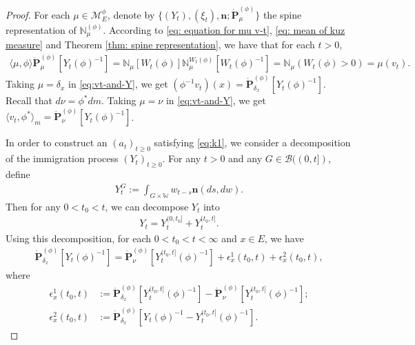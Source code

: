 \documentclass[12pt,a4paper]{amsart}
\theoremstyle{definition}
\numberwithin{equation}{section}
\begin{document}
\begin{proof}
  For each $\mu\in\mathcal M^\phi_E$, denote by $\{(Y_t), (\xi_t),\mathbf n; \dot {\mathbf P}^{(\phi)}_\mu\}$ the spine representation of $\mathbb N^{(\phi)}_\mu$.
	According to \eqref	{eq: equation for mu v-t}, \eqref{eq: mean of kuz measure} and Theorem \ref{thm: spine representation}, we have that for each $t>0$,
  \begin{align}
    \label{eq:vt-and-Y}
    \langle \mu,\phi \rangle \dot {\mathbf P}^{(\phi)}_\mu [Y_t(\phi)^{-1}]
    = \mathbb N_\mu[W_t(\phi)] \mathbb N^{W_t(\phi)}_\mu [W_t(\phi)^{-1}]
    = \mathbb N_\mu(W_t(\phi) > 0)
    = \mu(v_t).
  \end{align}
  Taking $\mu = \delta_x$ in \eqref{eq:vt-and-Y}, we get $(\phi^{-1}v_t)(x) =\dot{\mathbf P}_{\delta_x}^{(\phi)}[Y_t(\phi)^{-1}]$.
  Recall that $d\nu = \phi^* dm$.
  Taking $\mu = \nu$ in \eqref{eq:vt-and-Y}, we get $\langle v_t, \phi^*\rangle_m = \dot {\mathbf P}_{\nu}^{(\phi)} [Y_t(\phi)^{-1}]$.
  
  In order to construct an $(a_t)_{t\geq 0}$ satisfying \eqref{eq:k1}, we consider a decomposition of the immigration process $(Y_t)_{t\geq 0}$.
  For any $t>0$ and any $G\in \mathscr B((0,t])$, define
  \begin{align}
    Y^G_t
    := \int_{G\times \mathbb W} w_{t-s} \mathbf n(ds,dw).
  \end{align}
  Then for any $0 < t_0 < t$, we can decompose $Y_t$ into
  \begin{align}
    Y_t
    = Y^{(0,t_0]}_t + Y^{(t_0,t]}_t.
  \end{align}
  Using this decomposition, for each $0<t_0<t<\infty$ and $x\in E$, we have
  \begin{align}
    \label{eq: starting point of phi-1v_t(x)}
    \dot{\mathbf P}_{\delta_x}^{(\phi)}[Y_t(\phi)^{-1}]
    = \dot {\mathbf P}_\nu^{(\phi)} [Y^{(t_0,t]}_t(\phi)^{-1}] + \epsilon_x^1(t_0,t) +\epsilon_x^2(t_0,t),
  \end{align}
  where
  \begin{align}
    \epsilon_x^1(t_0,t)
    &:= \dot {\mathbf P}_{\delta_x}^{(\phi)} [Y^{(t_0,t]}_t(\phi)^{-1}] - \dot {\mathbf P}_\nu^{(\phi)} [Y^{(t_0,t]}_t(\phi)^{-1}];
    \\\epsilon_x^2(t_0,t)
    &:= \dot{\mathbf P}_{\delta_x}^{(\phi)}[Y_t(\phi)^{-1} - Y^{(t_0,t]}_t(\phi)^{-1}].
  \end{align}


\end{proof}
\end{document}
